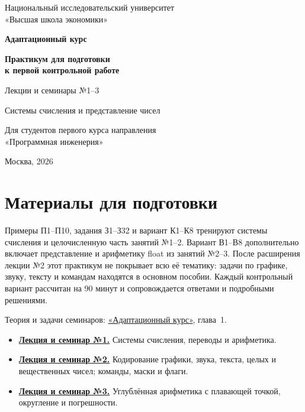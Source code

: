 \hypersetup{pageanchor=false}
\begin{titlepage}
\begin{center}
Национальный исследовательский университет\\
«Высшая школа экономики»

\vfill
{\Large\textbf{Адаптационный курс}}\par
\vspace{0.7cm}
{\large\textbf{Практикум для подготовки\\к первой контрольной работе}}\par
\vspace{0.7cm}
Лекции и семинары №1--3\par
Системы счисления и представление чисел

\vfill
Для студентов первого курса направления\\
«Программная инженерия»

\vspace{1cm}
Москва, 2026
\end{center}
\end{titlepage}
\clearpage
\hypersetup{pageanchor=true}

\chapter{Материалы для подготовки}
Примеры П1--П10, задания З1--З32 и вариант К1--К8 тренируют системы
счисления и целочисленную часть занятий №1--2. Вариант В1--В8 дополнительно
включает представление и арифметику float из занятий №2--3.
После расширения лекции №2 этот практикум не покрывает всю её тематику:
задачи по графике, звуку, тексту и командам находятся в основном пособии.
Каждый контрольный вариант рассчитан на 90 минут и сопровождается
ответами и подробными решениями.

Теория и задачи семинаров: \href{adaptation_course.pdf}{«Адаптационный курс»}, глава~1.
\begin{itemize}
    \item \href{adaptation_course.pdf}{\textbf{Лекция и семинар №1.}} Системы счисления, переводы и арифметика.
    \item \href{adaptation_course.pdf}{\textbf{Лекция и семинар №2.}} Кодирование
    графики, звука, текста, целых и вещественных чисел; команды, маски и флаги.
    \item \href{adaptation_course.pdf}{\textbf{Лекция и семинар №3.}} Углублённая
    арифметика с плавающей точкой, округление и погрешности.
\end{itemize}

